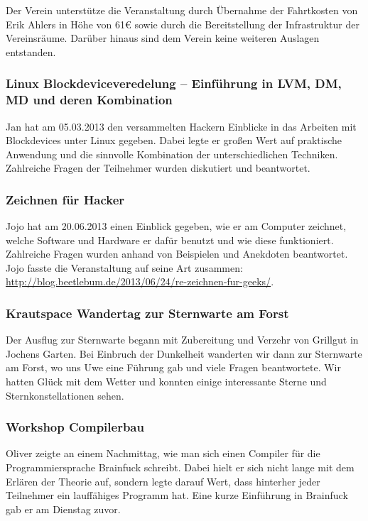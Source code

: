 \documentclass[10pt,DIV16]{scrartcl}
\begin{document}
Der Verein unterstütze die Veranstaltung durch Übernahme der
Fahrtkosten von Erik Ahlers in Höhe von 61\euro{} sowie durch die
Bereitstellung der Infrastruktur der Vereinsräume. Darüber hinaus
sind dem Verein keine weiteren Auslagen entstanden.

\subsubsection{Linux Blockdeviceveredelung -- Einführung in LVM, DM, MD und deren Kombination}

Jan hat am 05.03.2013 den versammelten Hackern Einblicke in das
Arbeiten mit Blockdevices unter Linux gegeben. Dabei legte er großen
Wert auf praktische Anwendung und die sinnvolle Kombination der
unterschiedlichen Techniken. Zahlreiche Fragen der Teilnehmer wurden
diskutiert und beantwortet.

\subsubsection{Zeichnen für Hacker}

Jojo hat am 20.06.2013 einen Einblick gegeben, wie er am Computer
zeichnet, welche Software und Hardware er dafür benutzt und wie diese
funktioniert. Zahlreiche Fragen wurden anhand von Beispielen und
Anekdoten beantwortet. Jojo fasste die Veranstaltung auf seine Art
zusammen:
\url{http://blog.beetlebum.de/2013/06/24/re-zeichnen-fur-geeks/}.

\subsubsection{Krautspace Wandertag zur Sternwarte am Forst}

Der Ausflug zur Sternwarte begann mit Zubereitung und Verzehr von Grillgut in
Jochens Garten. Bei Einbruch der Dunkelheit wanderten wir dann zur Sternwarte
am Forst, wo uns Uwe eine Führung gab und viele Fragen beantwortete. Wir
hatten Glück mit dem Wetter und konnten einige interessante Sterne und 
Sternkonstellationen sehen.

\subsubsection{Workshop Compilerbau}

Oliver zeigte an einem Nachmittag, wie man sich einen Compiler für die
Programmiersprache Brainfuck schreibt. Dabei hielt er sich nicht lange mit
dem Erlären der Theorie auf, sondern legte darauf Wert, dass hinterher jeder
Teilnehmer ein lauffähiges Programm hat. Eine kurze Einführung in Brainfuck
gab er am Dienstag zuvor.
\end{document}
